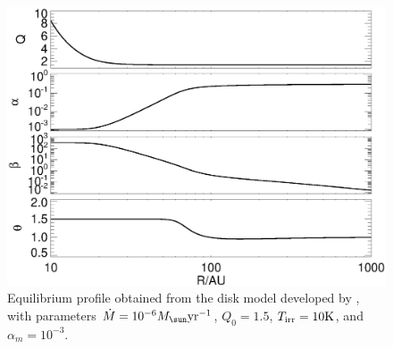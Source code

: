 \begin{figure}
  \includegraphics[width=\linewidth,clip=true,trim=0cm 0cm 0cm
    0.0cm]{figures/ppd_2d_basic}
  \caption{Equilibrium profile obtained from the disk model developed
    by \cite{rafikov15}, with parameters $\dot{M} =
    10^{-6}M_\sun\yr^{-1}$, $Q_0=1.5$, $T_\mathrm{irr}=10\mathrm{K}$, and
    $\alpha_m=10^{-3}$.   
    \label{rafikov_model}}
\end{figure}

